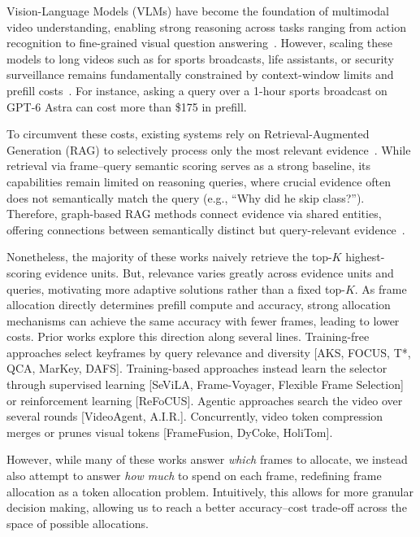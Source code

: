 Vision-Language Models (VLMs) have become the foundation of multimodal video understanding, enabling strong reasoning across tasks ranging from action recognition to fine-grained visual question answering~\cite{bai2025qwen3vl,wang2025internvl35}. However, scaling these models to long videos such as for sports broadcasts, life assistants, or security surveillance remains fundamentally constrained by context-window limits and prefill costs~\cite{chen2024fastv,yang2024visionzip}. For instance, asking a query over a 1-hour sports broadcast on GPT-6 Astra can cost more than \$175 in prefill.

To circumvent these costs, existing systems rely on Retrieval-Augmented Generation (RAG) to selectively process only the most relevant evidence~\cite{luo2024videorag,ren2025videorag,shen2025vgent}. While retrieval via frame--query semantic scoring serves as a strong baseline, its capabilities remain limited on reasoning queries, where crucial evidence often does not semantically match the query (e.g., ``Why did he skip class?''). Therefore, graph-based RAG methods connect evidence via shared entities, offering connections between semantically distinct but query-relevant evidence~\cite{ren2025videorag,shen2025vgent}.

Nonetheless, the majority of these works naively retrieve the top-$K$ highest-scoring evidence units. But, relevance varies greatly across evidence units and queries, motivating more adaptive solutions rather than a fixed top-$K$. As frame allocation directly determines prefill compute and accuracy, strong allocation mechanisms can achieve the same accuracy with fewer frames, leading to lower costs. Prior works explore this direction along several lines. Training-free approaches select keyframes by query relevance and diversity [AKS, FOCUS, T*, QCA, MarKey, DAFS]. Training-based approaches instead learn the selector through supervised learning [SeViLA, Frame-Voyager, Flexible Frame Selection] or reinforcement learning [ReFoCUS]. Agentic approaches search the video over several rounds [VideoAgent, A.I.R.]. Concurrently, video token compression merges or prunes visual tokens [FrameFusion, DyCoke, HoliTom].


However, while many of these works answer \textit{which} frames to allocate, we instead also attempt to answer \textit{how much} to spend on each frame, redefining frame allocation as a token allocation problem. Intuitively, this allows for more granular decision making, allowing us to reach a better accuracy--cost trade-off across the space of possible allocations.

